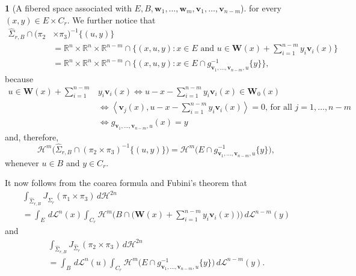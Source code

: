 \documentclass[11pt]{article}
\newcounter{cdrthm}[section]
\theoremstyle{definition}
\theoremstyle{jepanonymous}
\newtheorem{jepempty}[cdrthm]{}
\newenvironment{enonce}[2][remark]{\begin{jepempty}[#2]}{\end{jepempty}}
\theoremstyle{plain}
\newenvironment{Empty}[2][\null]{%
\begin{enonce}[remark]{#1}#2}
{\end{enonce}}
\newcommand{\R}{\mathbb{R}}
\newcommand{\Rn}{\R^n}
\newcommand{\calH}{\mathscr{H}}
\newcommand{\calL}{\mathscr{L}}
\newcommand{\bW}{{\boldsymbol{W}}}
\newcommand{\bv}{{\boldsymbol{v}}}
\newcommand{\bw}{{\boldsymbol{w}}}
\let\la\langle
\let\ra\rangle
\begin{document}
\begin{Empty}[A fibered space associated with $E, B, \bw_1,\ldots,\bw_m,\bv_1,\ldots,\bv_{n-m}$]
for every $(x,y) \in E \times C_r$.
We further notice that
\begin{equation*}
\begin{split}
\hat{\Sigma}_{r,B} \cap (\pi_2 & \times \pi_3)^{-1} \{ (u,y) \} \\
& \textstyle = \Rn \times \Rn \times \R^{n-m} \cap \bigl\{ (x,u,y): x \in E \text{ and } u \in \bW(x) + \sum_{i=1}^{n-m} y_i\bv_i(x)\bigr\}\\
&= \Rn \times \Rn \times \R^{n-m} \cap \bigl\{ (x,u,y): x \in E \cap g_{\bv_1,\ldots,\bv_{n-m},u}^{-1}\{y\} \bigr\},
\end{split}
\end{equation*}
because
\begin{equation*}
\begin{split}
u \in \bW(x) + \sum_{i=1}^{n-m} &y_i \bv_i(x)  \iff u-x- \sum_{i=1}^{n-m} y_i \bv_i(x) \in \bW_0(x) \\
& \iff \textstyle\left\la \bv_j(x), u-x- \sum_{i=1}^{n-m} y_i \bv_i(x) \right\ra = 0 \text{, for all } j=1,\ldots,n-m \\
& \iff g_{\bv_1,\ldots,\bv_{n-m},u}(x) = y
\end{split}
\end{equation*}
and, therefore,
\begin{equation*}
\calH^m \bigl(\hat{\Sigma}_{r,B} \cap (\pi_2 \times \pi_3)^{-1} \{ (u,y) \} \bigr) = \calH^m \bigl(E \cap g_{\bv_1,\ldots,\bv_{n-m},u}^{-1}\{y\} \bigr),
\end{equation*}
whenever $u \in B$ and $y \in C_r$.
\par
It now follows from the coarea formula and Fubini's theorem that
\begin{multline}
\label{eq.20}
\int_{\hat{\Sigma}_{r,B}} J_{\hat{\Sigma}_r} (\pi_1 \times \pi_3) \,d\calH^{2n}\\[-5pt]
= \int_E \,d\calL^n(x)\int_{C_r} \calH^m \bigl(B \cap \bigl(\bW(x) + \textstyle\sum_{i=1}^{n-m} y_i \bv_i(x) \bigr) \bigr) \,d\calL^{n-m}(y)
\end{multline}
and
\begin{multline}
\label{eq.21}
\int_{\hat{\Sigma}_{r,B}} J_{\hat{\Sigma}_r} (\pi_2 \times \pi_3) \,d\calH^{2n}\\[-5pt]
= \int_B \,d\calL^n(u) \int_{C_r} \calH^m \bigl(E \cap g_{\bv_1,\ldots,\bv_{n-m},u}^{-1}\{y\} \bigr)\,d\calL^{n-m}(y).
\end{multline}
\end{Empty}
\end{document}
